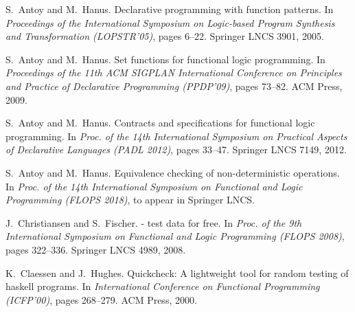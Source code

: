 \documentclass[11pt,fleqn]{article}
\begin{document}
\sloppy



\begin{thebibliography}{10}

S.~Antoy and M.~Hanus.
\newblock Declarative programming with function patterns.
\newblock In {\em Proceedings of the International Symposium on Logic-based
  Program Synthesis and Transformation (LOPSTR'05)}, pages 6--22. Springer LNCS
  3901, 2005.

S.~Antoy and M.~Hanus.
\newblock Set functions for functional logic programming.
\newblock In {\em Proceedings of the 11th ACM SIGPLAN International Conference
  on Principles and Practice of Declarative Programming (PPDP'09)}, pages
  73--82. ACM Press, 2009.

S.~Antoy and M.~Hanus.
\newblock Contracts and specifications for functional logic programming.
\newblock In {\em Proc. of the 14th International Symposium on Practical
  Aspects of Declarative Languages (PADL 2012)}, pages 33--47. Springer LNCS
  7149, 2012.

S.~Antoy and M.~Hanus.
\newblock Equivalence checking of non-deterministic operations.
\newblock In {\em Proc. of the 14th International Symposium on
  Functional and Logic Programming (FLOPS 2018)}, to appear in Springer LNCS.

J.~Christiansen and S.~Fischer.
 - test data for free.
\newblock In {\em Proc. of the 9th International Symposium on Functional and
  Logic Programming (FLOPS 2008)}, pages 322--336. Springer LNCS 4989, 2008.

K.~Claessen and J.~Hughes.
\newblock Quickcheck: A lightweight tool for random testing of haskell
  programs.
\newblock In {\em International Conference on Functional Programming
  (ICFP'00)}, pages 268--279. ACM Press, 2000.


\end{thebibliography}
\end{document}

